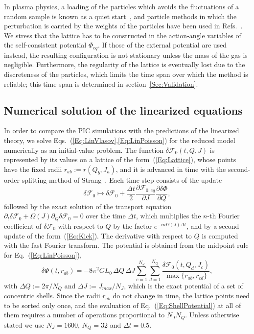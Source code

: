 In plasma physics, a loading of the particles which avoids the fluctuations of a random sample is known as a quiet start~\cite{BirdsallLangdon-Book}, and particle methods in which the perturbation is carried by the weights of the particles have been used in Refs.~\cite{fLfCjB93,jBaOyY11}. We stress that the lattice has to be constructed in the action-angle variables of the self-consistent potential $\Phi_{eq}$. If those of the external potential are used instead, the resulting configuration is not stationary unless the mass of the gas is negligible. Furthermore, the regularity of the lattice is eventually lost due to the discreteness of the particles, which limits the time span over which the method is reliable; this time span is determined in section~\ref{Sec:Validation}.


\subsection{Numerical solution of the linearized equations}
\label{SubSec:LinSolver}

In order to compare the PIC simulations with the predictions of the linearized theory, we solve Eqs.~(\ref{Eq:LinVlasov},\ref{Eq:LinPoisson}) for the reduced model numerically as an initial-value problem. The function $\delta\mathcal{F}_0(t,Q,J)$ is represented by its values on a lattice of the form~(\ref{Eq:Lattice}), whose points have the fixed radii $r_{ab} := r(Q_b,J_a)$, and it is advanced in time with the second-order splitting method of Strang~\cite{gS68}. Each time step consists of the update
\begin{equation}
\delta\mathcal{F}_0\mapsto \delta\mathcal{F}_0 + \frac{\Delta t}{2}\frac{\partial\mathcal{F}_{0,eq}}{\partial J}\frac{\partial\delta\Phi}{\partial Q},
\label{Eq:Kick}
\end{equation}
followed by the exact solution of the transport equation $\partial_t\delta\mathcal{F}_0 + \Omega(J)\partial_Q\delta\mathcal{F}_0 = 0$ over the time $\Delta t$, which multiplies the $n$-th Fourier coefficient of $\delta\mathcal{F}_0$ with respect to $Q$ by the factor $e^{-in\Omega(J)\Delta t}$, and by a second update of the form~(\ref{Eq:Kick}). The derivative with respect to $Q$ is computed with the fast Fourier transform. The potential is obtained from the midpoint rule for Eq.~(\ref{Eq:LinPoisson}),
\begin{equation}
\delta\Phi(t,r_{ab}) = -8\pi^2 G L_0\,\Delta Q\,\Delta J\sum\limits_{c=1}^{N_J}\sum\limits_{d=1}^{N_Q} \frac{\delta\mathcal{F}_0(t,Q_d,J_c)}{\max\{ r_{ab},r_{cd} \}},
\label{Eq:ShellPotential}
\end{equation}
with $\Delta Q := 2\pi/N_Q$ and $\Delta J := J_{max}/N_J$, which is the exact potential of a set of concentric shells. Since the radii $r_{ab}$ do not change in time, the lattice points need to be sorted only once, and the evaluation of Eq.~(\ref{Eq:ShellPotential}) at all of them requires a number of operations proportional to $N_J N_Q$. Unless otherwise stated we use $N_J = 1600$, $N_Q = 32$ and $\Delta t = 0.5$.

